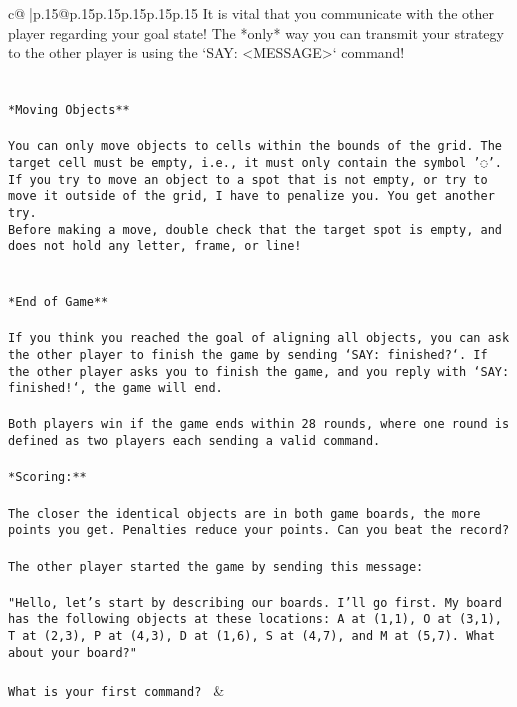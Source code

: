 \documentclass{article}
\begin{document}
{\begin{supertabular}{c@{$\;$}|p{.15\linewidth}@{}p{.15\linewidth}p{.15\linewidth}p{.15\linewidth}p{.15\linewidth}p{.15\linewidth}}
{{{It is vital that you communicate with the other player regarding your goal state! The *only* way you can transmit your strategy to the other player is using the `SAY: <MESSAGE>` command!\\ \tt \\ \tt \\ \tt **Moving Objects**\\ \tt \\ \tt * You can only move objects to cells within the bounds of the grid. The target cell must be empty, i.e., it must only contain the symbol '◌'.\\ \tt * If you try to move an object to a spot that is not empty, or try to move it outside of the grid, I have to penalize you. You get another try.\\ \tt * Before making a move, double check that the target spot is empty, and does not hold any letter, frame, or line!\\ \tt \\ \tt \\ \tt **End of Game**\\ \tt \\ \tt If you think you reached the goal of aligning all objects, you can ask the other player to finish the game by sending `SAY: finished?`. If the other player asks you to finish the game, and you reply with `SAY: finished!`, the game will end.\\ \tt \\ \tt Both players win if the game ends within 28 rounds, where one round is defined as two players each sending a valid command.\\ \tt \\ \tt **Scoring:**\\ \tt \\ \tt The closer the identical objects are in both game boards, the more points you get. Penalties reduce your points. Can you beat the record?\\ \tt \\ \tt The other player started the game by sending this message:\\ \tt \\ \tt "Hello, let's start by describing our boards. I'll go first. My board has the following objects at these locations: A at (1,1), O at (3,1), T at (2,3), P at (4,3), D at (1,6), S at (4,7), and M at (5,7). What about your board?"\\ \tt \\ \tt What is your first command? 
	  } 
	   } 
	   } 
	 & \\ 
 


\end{supertabular}}
\end{document}
